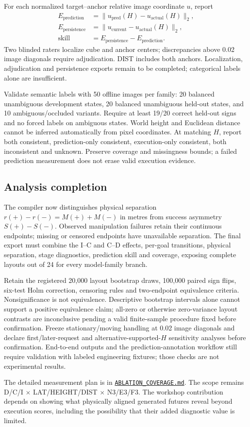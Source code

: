 For each normalized target--anchor relative image coordinate $u$, report
\begin{align}
E_{\mathrm{prediction}} &= \lVert u_{\mathrm{pred}}(H)-u_{\mathrm{actual}}(H)\rVert_2,\\
E_{\mathrm{persistence}} &= \lVert u_{\mathrm{current}}-u_{\mathrm{actual}}(H)\rVert_2,\\
\mathrm{skill} &= E_{\mathrm{persistence}}-E_{\mathrm{prediction}}.
\end{align}
Two blinded raters localize cube and anchor centers; discrepancies above 0.02 image diagonals require adjudication. DIST includes both anchors. Localization, adjudication and persistence exports remain to be completed; categorical labels alone are insufficient.

Validate semantic labels with 50 offline images per family: 20 balanced unambiguous development states, 20 balanced unambiguous held-out states, and 10 ambiguous/occluded variants. Require at least 19/20 correct held-out signs and no forced labels on ambiguous states. World height and Euclidean distance cannot be inferred automatically from pixel coordinates. At matching $H$, report both consistent, prediction-only consistent, execution-only consistent, both inconsistent and unknown. Preserve coverage and missingness bounds; a failed prediction measurement does not erase valid execution evidence.

\subsection{Analysis completion}
The compiler now distinguishes physical separation $r(+)-r(-)=M(+)+M(-)$ in metres from success asymmetry $S(+)-S(-)$. Observed manipulation failures retain their continuous endpoints; missing or censored endpoints have unavailable separation. The final export must combine the I--C and C--D effects, per-goal transitions, physical separation, stage diagnostics, prediction skill and coverage, exposing complete layouts out of 24 for every model-family branch.

Retain the registered 20,000 layout bootstrap draws, 100,000 paired sign flips, six-test Holm correction, censoring rules and two-endpoint equivalence criteria. Nonsignificance is not equivalence. Descriptive bootstrap intervals alone cannot support a positive equivalence claim; all-zero or otherwise zero-variance layout contrasts are inconclusive pending a valid finite-sample procedure fixed before confirmation. Freeze stationary/moving handling at 0.02 image diagonals and declare first/later-request and alternative-supported-$H$ sensitivity analyses before confirmation. End-to-end outputs and the prediction-annotation workflow still require validation with labeled engineering fixtures; those checks are not experimental results.

The detailed measurement plan is in
\href{https://github.com/adeeb10abbas/world-action-model-steerability/blob/main/docs/scene_design_rtx/ABLATION_COVERAGE.md}{\texttt{ABLATION\_COVERAGE.md}}.
The scope remains D/C/I $\times$ LAT/HEIGHT/DIST $\times$ N3/E3/F3. The workshop contribution depends on showing what physically aligned generated futures reveal beyond execution scores, including the possibility that their added diagnostic value is limited.
